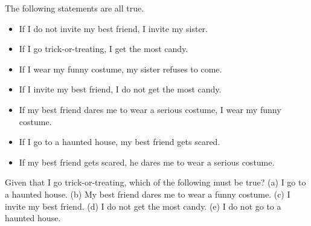 The following statements are all true.
\begin{itemize}
\item If I do not invite my best friend, I invite my sister.
\item If I go trick-or-treating, I get the most candy.
\item If I wear my funny costume, my sister refuses to come.
\item If I invite my best friend, I do not get the most candy.
\item If my best friend dares me to wear a serious costume, I wear my funny costume.
\item If I go to a haunted house, my best friend gets scared.
\item If my best friend gets scared, he dares me to wear a serious costume.
\end{itemize}
Given that I go trick-or-treating, which of the following must be true? (a) I go to a haunted house. (b) My best friend dares me to wear a funny costume. (c) I invite my best friend. (d) I do not get the most candy. (e) I do not go to a haunted house.
